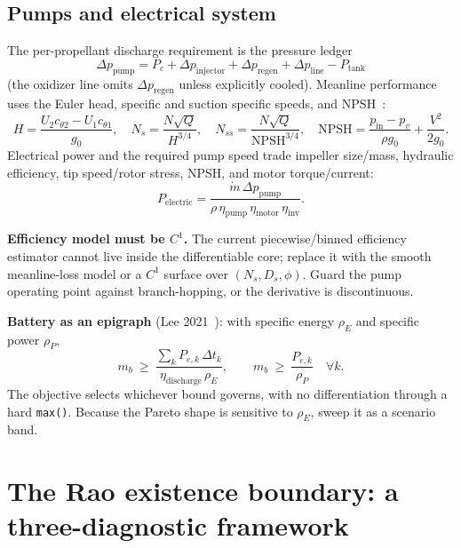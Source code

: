 \documentclass[11pt]{article}
\newcommand{\cmd}[1]{\nolinkurl{#1}}
\newcommand{\mdot}{\dot m}
\begin{document}
\subsection{Pumps and electrical system}
The per-propellant discharge requirement is the pressure ledger
\begin{equation}
\Delta p_\mathrm{pump}=P_c+\Delta p_\mathrm{injector}
+\Delta p_\mathrm{regen}+\Delta p_\mathrm{line}-P_\mathrm{tank}
\end{equation}
(the oxidizer line omits $\Delta p_\mathrm{regen}$ unless explicitly cooled).
Meanline performance uses the Euler head, specific and suction specific speeds,
and NPSH~\cite{sp8109,sp8052}:
\begin{equation}
H=\frac{U_2 c_{\theta 2}-U_1 c_{\theta 1}}{g_0},
\quad
N_s=\frac{N\sqrt{Q}}{H^{3/4}},
\quad
N_{ss}=\frac{N\sqrt{Q}}{\mathrm{NPSH}^{3/4}},
\quad
\mathrm{NPSH}=\frac{p_\mathrm{in}-p_v}{\rho g_0}+\frac{V^{2}}{2g_0}.
\end{equation}
Electrical power and the required pump speed trade impeller size/mass, hydraulic
efficiency, tip speed/rotor stress, NPSH, and motor torque/current:
\begin{equation}
P_\mathrm{electric}=\frac{\mdot\,\Delta p_\mathrm{pump}}
{\rho\,\eta_\mathrm{pump}\,\eta_\mathrm{motor}\,\eta_\mathrm{inv}} .
\end{equation}
\begin{warnbox}
\textbf{Efficiency model must be $C^1$.} The current piecewise/binned efficiency
estimator cannot live inside the differentiable core; replace it with the smooth
meanline-loss model or a $C^1$ surface over $(N_s,D_s,\phi)$. Guard the pump
operating point against branch-hopping, or the derivative is discontinuous.
\end{warnbox}
\textbf{Battery as an epigraph} (Lee 2021~\cite{lee2021}): with specific energy
$\rho_E$ and specific power $\rho_P$,
\begin{equation}
m_b\ \ge\ \frac{\sum_k P_{e,k}\,\Delta t_k}{\eta_\mathrm{discharge}\,\rho_E},
\qquad
m_b\ \ge\ \frac{P_{e,k}}{\rho_P}\quad\forall k .
\label{eq:battery}
\end{equation}
The objective selects whichever bound governs, with no differentiation through a
hard \cmd{max()}. Because the Pareto shape is sensitive to $\rho_E$, sweep it as
a scenario band.

\section{The Rao existence boundary: a three-diagnostic framework}
\label{sec:cliff}
\end{document}
